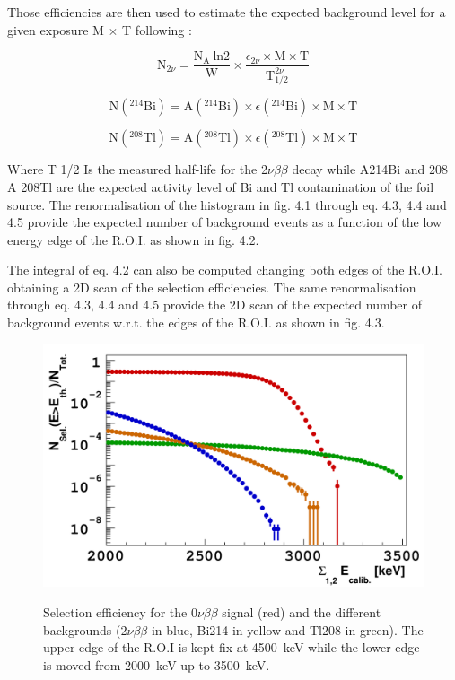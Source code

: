 \documentclass[main.tex]{subfiles}
\begin{document}
\bigskip


\NI Those efficiencies are then used to estimate the expected background level for a given exposure M $\times$ T following :


\begin{equation}
\text{N}_{\text{2}\nu} = \frac{\text{N}_\text{A}~\text{ln2}}{\text{W}} \times \frac{\epsilon_{\text{2}\nu} \times \text{M} \times \text{T}}{\text{T}_{\text{1/2}}^{\text{2}\nu}}
\end{equation}


\begin{equation}
\text{N} (^{\text{214}}\text{Bi}) = \text{A} (^{\text{214}}\text{Bi}) \times \epsilon (^{\text{214}}\text{Bi}) \times \text{M} \times \text{T} 
\end{equation}


\begin{equation}
\text{N} (^{\text{208}}\text{Tl}) = \text{A} (^{\text{208}}\text{Tl}) \times \epsilon (^{\text{208}}\text{Tl}) \times \text{M} \times \text{T} 
\end{equation}


\NI Where T 1/2 Is the measured half-life for the 2$\nu\beta\beta$ decay while A214Bi and 208 A 208Tl are the expected activity level of Bi and Tl contamination of the foil source. The renormalisation of the histogram in fig. 4.1 through eq. 4.3, 4.4 and 4.5 provide the expected number of background events as a function of the low energy edge of the R.O.I. as shown in fig. 4.2.


\bigskip


\NI The integral of eq. 4.2 can also be computed changing both edges of the R.O.I. obtaining a 2D scan of the selection efficiencies. The same renormalisation through eq. 4.3, 4.4 and 4.5 provide the 2D scan of the expected number of background events w.r.t. the edges of the R.O.I. as shown in fig. 4.3.

\begin{figure}[h!]
\centering
\includegraphics[scale=0.25]{pictures/Chap4/SelectionEfficiency.png}
\label{SelectionEfficiency.png}
\caption{Selection efficiency for the 0$\nu\beta\beta$ signal (red) and the different backgrounds (2$\nu\beta\beta$ in blue, Bi214 in yellow and Tl208 in green). The upper edge of the R.O.I is kept fix at 4500~keV while the lower edge is moved from 2000~keV up to 3500~keV.}
\end{figure}
\end{document}

